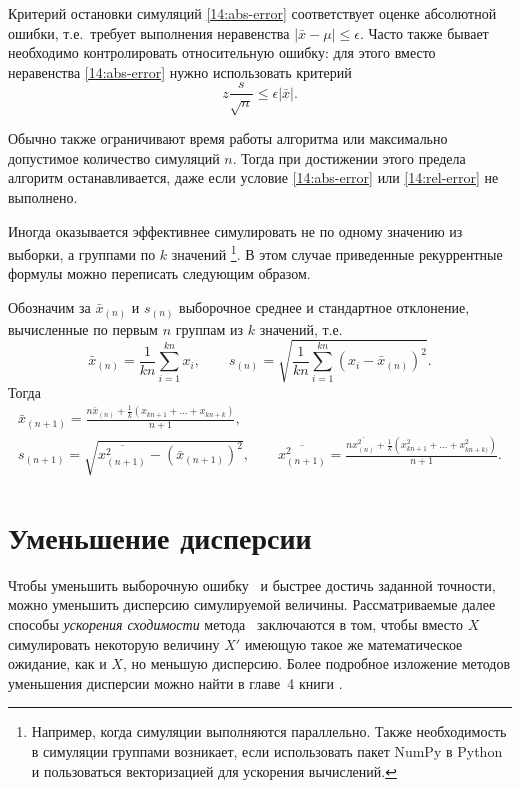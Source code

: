 \begin{remark}
Критерий остановки симуляций \eqref{14:abs-error} соответствует оценке абсолютной ошибки, т.е.\ требует выполнения неравенства $|\bar x - \mu| \le \epsilon$.
Часто также бывает необходимо контролировать относительную ошибку: для этого вместо неравенства \eqref{14:abs-error} нужно использовать критерий
\begin{equation}
\label{14:rel-error}
z \frac{s}{\sqrt{n}} \le \epsilon |\bar x|.
\end{equation}

Обычно также ограничивают время работы алгоритма или максимально допустимое количество симуляций $n$. 
Тогда при достижении этого предела алгоритм останавливается, даже если условие \eqref{14:abs-error} или \eqref{14:rel-error} не выполнено.
\end{remark}

\begin{remark}
Иногда оказывается эффективнее симулировать не по одному значению из выборки, а группами по $k$ значений%
\footnote{Например, когда симуляции выполняются параллельно.
Также необходимость в симуляции группами возникает, если использовать пакет NumPy в Python и пользоваться векторизацией для ускорения вычислений.}.
В этом случае приведенные рекуррентные формулы можно переписать следующим образом.

Обозначим за $\bar x_{(n)}$ и $s_{(n)}$ выборочное среднее и стандартное отклонение, вычисленные по первым $n$ группам из $k$ значений, т.е.
\[
\bar x_{(n)} = \frac{1}{kn} \sum_{i=1}^{kn} x_i, \qquad
s_{(n)} = \sqrt{\frac{1}{kn} \sum_{i=1}^{kn} (x_i - \bar x_{(n)})^2}.
\]
Тогда
\begin{gather*}
\bar x_{(n+1)} = \frac{n\bar x_{(n)} + \frac1k (x_{kn+1}+\dots+x_{kn+k})}{n+1}, \\
s_{(n+1)} = \sqrt{\overline{x_{(n+1)}^2} - (\bar x_{(n+1)})^2},\qquad
\overline{x_{(n+1)}^2} = \frac{n\overline{x_{(n)}^2} + \frac1k (x_{kn+1}^2+\dots+x_{kn+k)}^2)}{n+1}.
\end{gather*}
\end{remark}


\section{Уменьшение дисперсии}

Чтобы уменьшить выборочную ошибку \mc\ и быстрее достичь заданной точности, можно уменьшить дисперсию симулируемой величины.
Рассматриваемые далее способы \emph{ускорения сходимости} метода \mc\ заключаются в том, чтобы вместо $X$ симулировать некоторую величину $X'$ имеющую такое же математическое ожидание, как и $X$, но меньшую дисперсию.
Более подробное изложение методов уменьшения дисперсии можно найти в главе~4 книги \cite{Glasserman03}.


